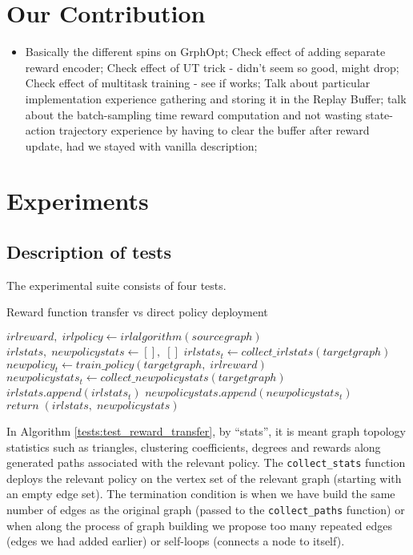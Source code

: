 \documentclass{report}
\numberwithin{equation}{section}
\numberwithin{figure}{section}
\numberwithin{table}{section}
\numberwithin{algorithm}{section}
\begin{document}
\chapter{Our Contribution}
\begin{itemize}
  \item Basically the different spins on GrphOpt;
    \subitem Check effect of adding separate reward encoder;
    \subitem Check effect of UT trick - didn't seem so good, might drop;
    \subitem Check effect of multitask training - see if works;
    \subitem Talk about particular implementation experience
      gathering and storing it in the Replay Buffer; talk about 
      the batch-sampling time reward computation and not wasting 
      state-action trajectory experience by having to clear the 
      buffer after reward update, had we stayed with vanilla description;
\end{itemize}

\chapter{Experiments}

\section{Description of tests}
\label{sec:test_description}
The experimental suite consists of four tests.
\begin{algorithm}
  \caption{Reward function transfer vs direct policy deployment}
  \label{tests:test_reward_transfer}
  \begin{algorithmic}
    \State $irlreward,\; irlpolicy \gets irlalgorithm(sourcegraph)$
    \State $irlstats,\; newpolicystats \gets [],\; []$
    \State $irlstats_t \gets collect\_irlstats(targetgraph)$
    \State $newpolicy_t \gets train\_policy(targetgraph,\; irlreward)$
    \State $newpolicystats_t \gets collect\_newpolicystats(targetgraph)$
    \State $irlstats.append(irlstats_t)$
    \State $newpolicystats.append(newpolicystats_t)$
    \EndFor
    \State $return\; (irlstats,\; newpolicystats)$
  \end{algorithmic}
\end{algorithm}
In Algorithm \ref{tests:test_reward_transfer}, by ``stats'', it is meant 
graph topology statistics such as triangles, clustering coefficients, 
degrees and rewards along generated paths associated with the 
relevant policy. The \verb|collect_stats| function deploys the relevant 
policy on the vertex set of the relevant graph (starting with an 
empty edge set). The termination condition is when we have build the same 
number of edges as the original graph (passed to the \verb|collect_paths|
function) or when along the process of graph building we propose 
too many repeated edges (edges we had added earlier) or 
self-loops (connects a node to itself).
\end{document}
